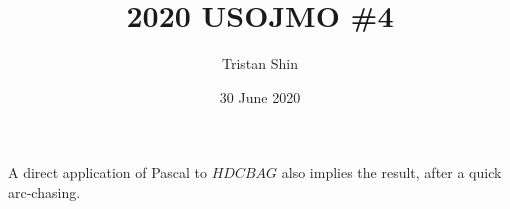 \documentclass[letter, 12pt]{article}
\title{2020 USOJMO \#4}
\author{Tristan Shin}
\date{30 June 2020}
\begin{document}
\maketitle


\hrulefill

\begin{solution}
\end{solution}
\begin{remark}
	A direct application of Pascal to $HDCBAG$ also implies the result, after a quick arc-chasing.
\end{remark}
\end{document}
